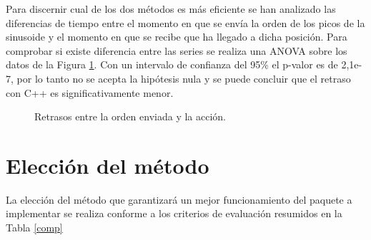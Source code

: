 \documentclass[12pt,a4paper,final,twoside]{book}
\begin{document}
Para discernir cual de los dos métodos es más eficiente se han analizado las diferencias de tiempo entre el momento en que se envía la orden de los picos de la sinusoide y el momento en que se recibe que ha llegado a dicha posición. Para comprobar si existe diferencia entre las series se realiza una ANOVA sobre los datos de la Figura \ref{fig:retras}. Con un intervalo de confianza del 95\% el p-valor es de 2,1e-7, por lo tanto no se acepta la hipótesis nula y se puede concluir que el retraso con C++ es significativamente menor. 
 
\begin{figure}[H]
	\centering
{}

	 \caption{Retrasos entre la orden enviada y la acción.}
  \label{fig:retras}
\end{figure}

\section{Elección del método}

La elección del método que garantizará un mejor funcionamiento del paquete a implementar se realiza conforme a los criterios de evaluación resumidos en la Tabla \ref{comp}
\end{document}
